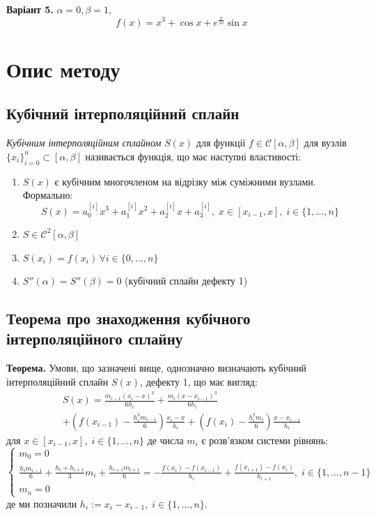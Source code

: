 \documentclass[12pt]{extarticle}
\begin{document}
\textbf{Варіант 5.} $\alpha=0,\beta=1$,
\[
f(x) = x^3 + \cos x + e^{\frac{x}{10}} \sin x
\]

\pagebreak
\section{Опис методу}

\subsection{Кубічний інтерполяційний сплайн}

\textit{Кубічним інтерполяційним сплайном} $S(x)$ для функції $f \in \mathcal{C}[\alpha,\beta]$ для вузлів $\{x_i\}_{i=0}^n \subset [\alpha,\beta]$ називається функція, що має наступні властивості:
\begin{enumerate}
    \item $S(x)$ є кубічним многочленом на відрізку між суміжними вузлами. Формально:
    \[
    S(x) = a_0^{[i]}x^3 + a_1^{[i]}x^2 + a_2^{[i]}x + a_3^{[i]}, \; x \in [x_{i-1},x], \; i \in \{1,\dots,n\}
    \]
    \item $S \in \mathcal{C}^2[\alpha,\beta]$
    \item $S(x_i) = f(x_i) \, \forall i \in \{0,\dots,n\}$
    \item $S''(\alpha)=S''(\beta)=0$ (кубічний сплайн дефекту 1)
\end{enumerate}

\subsection{Теорема про знаходження кубічного інтерполяційного сплайну}\label{sub:2-2}

\textbf{Теорема.} Умови, що зазначені вище, однозначно визначають кубічний інтерполяційний сплайн $S(x)$, дефекту 1, що має вигляд:
\begin{align*}
S(x) = \frac{m_{i-1}(x_i-x)^3}{6h_i} + \frac{m_i(x-x_{i-1})^3}{6h_i} \\ + \left(f(x_{i-1}) - \frac{h_i^2 m_{i-1}}{6}\right) \frac{x_i-x}{h_i} + \left(f(x_i)-\frac{h_i^2m_i}{6}\right) \frac{x - x_{i-1}}{h_i}
\end{align*}
для $x \in [x_{i-1},x], \; i \in \{1,\dots,n\}$ де числа $m_i$ є розв'язком системи рівнянь:
\[
\begin{cases}
    m_0 = 0 
    \\
    \frac{h_im_{i-1}}{6} + \frac{h_i+h_{i+1}}{3}m_i + \frac{h_{i+1}m_{i+1}}{6} = -\frac{f(x_i)-f(x_{i-1})}{h_i} + \frac{f(x_{i+1})-f(x_i)}{h_{i+1}},\; i \in \{1,\dots,n-1\} 
    \\
    m_n = 0
\end{cases}
\]
де ми позначили $h_i := x_i - x_{i-1}, \; i \in \{1,\dots,n\}$. 
\end{document}
